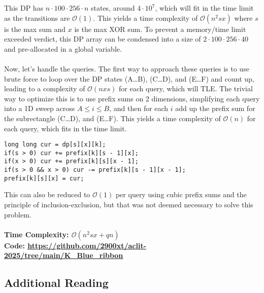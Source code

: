 \documentclass{article}
\newcommand{\link}[1]{\textcolor{blue!50!black}{\uline{\url{#1}}}}
\begin{document}
This DP has $n\cdot100\cdot256\cdot n$ states, around $4\cdot10^7$, which will fit in the time limit as the transitions are $\mathcal{O}(1)$. This yields a time complexity of $\mathcal{O}(n^2sx)$ where $s$ is the max sum and $x$ is the max XOR sum. To prevent a memory/time limit exceeded verdict, this DP array can be condensed into a size of $2\cdot100\cdot256\cdot40$ and pre-allocated in a global variable.
\\\\
Now, let's handle the queries. The first way to approach these queries is to use brute force to loop over the DP states (A\dots B), (C\dots D), and (E\dots F) and count up, leading to a complexity of $\mathcal{O}(nxs)$ for each query, which will TLE. The trivial way to optimize this is to use prefix sums on 2 dimensions, simplifying each query into a 1D sweep across $A \leq i \leq B$, and then for each $i$ add up the prefix sum for the subrectangle (C\dots D), and (E\dots F). This yields a time complexity of $\mathcal{O}(n)$ for each query, which fits in the time limit.
\begin{lstlisting}
long long cur = dp[s][x][k];
if(s > 0) cur += prefix[k][s - 1][x];
if(x > 0) cur += prefix[k][s][x - 1];
if(s > 0 && x > 0) cur -= prefix[k][s - 1][x - 1];
prefix[k][s][x] = cur;
\end{lstlisting}
This can also be reduced to $\mathcal{O}(1)$ per query using cubic prefix sums and the principle of inclusion-exclusion, but that was not deemed necessary to solve this problem.
\\\\
\textbf{Time Complexity: $\mathcal{O}(n^2sx + qn)$}\\
\textbf{Code: \link{https://github.com/2900xt/aclit-2025/tree/main/K_Blue_ribbon}} 
\subsection{Additional Reading}
\end{document}
